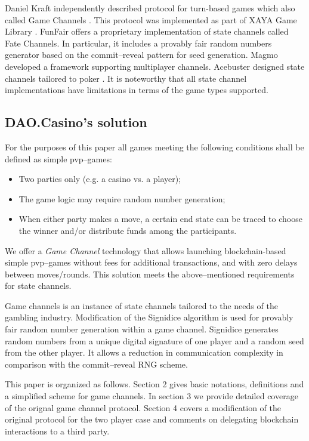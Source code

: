 	Daniel Kraft independently described protocol for turn-based games which also called Game Channels \cite{bib26}. This protocol was implemented as part of XAYA Game Library \cite{bib27}. FunFair \cite{bib15} offers a proprietary implementation of state channels called Fate Channels. In particular, it includes a provably fair random numbers generator based on the commit--reveal pattern for seed generation. Magmo \cite{bib16} developed a framework supporting multiplayer channels. Acebuster designed state channels tailored to poker \cite{bib17}. It is noteworthy that all state channel implementations have limitations in terms of the game types supported.

		\subsection {DAO.Casino's solution}
	For the purposes of this paper all games meeting the following conditions shall be defined as simple pvp--games:
	\begin{itemize}
		\item Two parties only (e.g. a casino vs. a player);
		\item The game logic may require random number generation;
		\item When either party makes a move, a certain end state can be traced to choose the winner and/or distribute funds among the participants.
	\end{itemize}
	We offer a \textit {Game Channel} technology that allows launching blockchain-based simple pvp--games without fees for additional transactions, and with zero delays between moves/rounds. This solution meets the above--mentioned requirements for state channels.

	Game channels is an instance of state channels tailored to the needs of the gambling industry. Modification of the Signidice \cite{bib18} algorithm is used for provably fair random number generation within a game channel. Signidice generates random numbers from a unique digital signature of one player and a random seed from the other player. It allows a reduction in communication complexity in comparison with the commit--reveal RNG scheme. 

This paper is organized as follows. Section 2 gives basic notations, definitions and a simplified scheme for game channels. In section 3 we provide detailed coverage of the orignal game channel protocol. Section 4 covers a modification of the original protocol for the two player case and comments on delegating blockchain interactions to a third party.